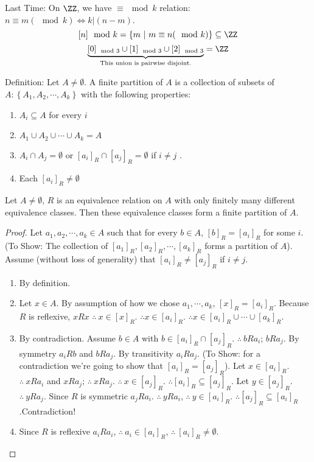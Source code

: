 Last Time: On $\ZZ$, we have $\equiv \mod k$ relation: $n \equiv m(\mod k) \iff k|(n-m)$.
\[ [n]{\mod k} = \left\{ m\ |\ m \equiv n (\mod k) \right\} \subseteq \ZZ \]
\[ \underbrace{[0]_{\mod 3} \cup [1]_{\mod 3} \cup [2]_{\mod 3}}_{\text{This union is pairwise disjoint.}} = \ZZ \]


\noindent
Definition: Let $A \neq \emptyset$. A finite partition of $A$ is a collection of subsets of $A : \left\{ A_1,A_2,\cdots,A_k \right\}$ with the following properties:
    \begin{enumerate}
        \item $A_i \subseteq A$ for every $i$
        \item $A_1 \cup A_2 \cup \cdots \cup A_k = A$
        \item $A_i \cap A_j = \emptyset$ or $[a_i]_R \cap [a_j]_R = \emptyset$ if  $i \neq j$ .
        \item Each $[a_i]_R \neq \emptyset$
    \end{enumerate}
\begin{theorem}[Textbook 6.2.12]
Let $A \neq \emptyset$, $R$ is an equivalence relation on $A$ with only finitely many different equivalence classes. Then these equivalence classes form a finite partition of $A$.
\end{theorem}
\begin{proof}
Let $a_1,a_2,\cdots,a_k\in A$ such that for every $b\in A$, $[b]_R=[a_i]_R$ for some $i$. (To Show: The collection of $[a_1]_R,[a_2]_R,\cdots,[a_k]_R$ forms a partition of $A$). Assume (without loss of generality) that $[a_i]_R\neq[a_j]_R$ if $i\neq j$.
\begin{enumerate}
    \item \checkmark By definition.
    \item Let $x\in A$. By assumption of how we chose $a_1,\cdots,a_k$, $[x]_R = [a_i]_R$. Because $R$ is reflexive, $xRx$ $\therefore\ x\in [x]_R$. $\therefore x\in[a_i]_R$. $\therefore x\in[a_i]_R\cup\cdots\cup[a_k]_R$. \checkmark
    \item By contradiction. Assume $b\in A$ with $b\in[a_i]_R\cap[a_j]_R$. $\therefore\ bRa_i$; $bRa_j$. By symmetry $a_iRb$ and $bRa_j$. By transitivity $a_iRa_j$. (To Show: for a contradiction we're going to show that $[a_i]_R=[a_j]_R$). Let $x\in[a_i]_R$. $\therefore\ xRa_i$ and $xRa_j$; $\therefore\ xRa_j$. $\therefore\ x\in [a_j]_R$. $\therefore [a_i]_R\subseteq[a_j]_R$. Let $y\in[a_j]_R$. $\therefore\ yRa_j$. Since $R$ is symmetric $a_jRa_i$. $\therefore\ yRa_i$, $\therefore\ y\in[a_i]_R$. $\therefore [a_j]_R\subseteq[a_i]_R$.Contradiction! \checkmark
    \item Since $R$ is reflexive $a_iRa_i$, $\therefore\ a_i\in[a_i]_R$, $\therefore\ [a_i]_R\neq\emptyset$. \checkmark
\end{enumerate}
\end{proof}
